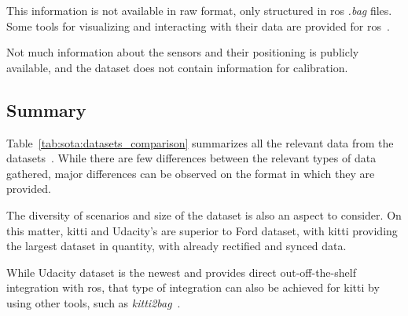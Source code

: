 This information is not available in raw format, only structured in \ac{ros} \textit{.bag} files. Some tools for visualizing and interacting with their data are provided for \ac{ros}~\cite{udacity}. 

Not much information about the sensors and their positioning is publicly available, and the dataset does not contain information for calibration.

\subsection{Summary}
Table~\ref{tab:sota:datasets_comparison} summarizes all the relevant data from the datasets~\cite{udacity, Pandey2011, Geiger2013a}. While there are few differences between the relevant types of data gathered, major differences can be observed on the format in which they are provided. 

The diversity of scenarios and size of the dataset is also an aspect to consider. On this matter, \ac{kitti} and Udacity's are superior to Ford dataset, with \ac{kitti} providing the largest dataset in quantity, with already rectified and synced data. 

While Udacity dataset is the newest and provides direct out-off-the-shelf integration with \ac{ros}, that type of integration can also be achieved for \ac{kitti} by using other tools, such as \textit{kitti2bag}~\cite{TomasKrejci}. 
	
